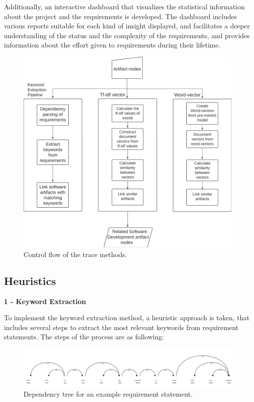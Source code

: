 Additionally, an interactive dashboard that visualizes the statistical information about the project and the requirements is developed. The dashboard includes various reports suitable for each kind of insight displayed, and facilitates a deeper understanding of the status and the complexity of the requirements, and provides information about the effort given to requirements during their lifetime.

\begin{figure}[htb]
    \centering
    \includegraphics[width=0.9\linewidth]{figs/tracemethods.png}
    \caption{Control flow of the trace methods.}
    \label{fig:trace-methods}
\end{figure}

\subsection{Heuristics}
\label{sec:heuristics}

\textbf{1 - Keyword Extraction}

To implement the keyword extraction method, a heuristic approach is taken, that includes several steps to extract the most relevant keywords from requirement statements. The steps of the process are as following:

\begin{figure}
    \centering
    \includegraphics[width=1\linewidth]{figs/displacy.png}
    \caption{Dependency tree for an example requirement statement.}
    \label{fig:deptree}
\end{figure}

